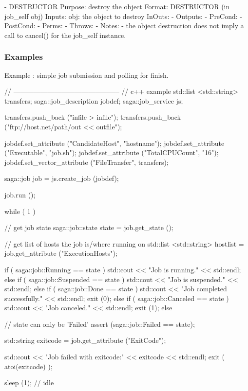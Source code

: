  \begin{myspec}
    - DESTRUCTOR
      Purpose:  destroy the object
      Format:   DESTRUCTOR        (in  job_self  obj)
      Inputs:   obj:               the object to destroy
      InOuts:   -
      Outputs:  -
      PreCond:  -
      PostCond: -
      Perms:    -
      Throws:   -
      Notes:    - the object destruction does not imply a 
                  call to cancel() for the job_self instance.
 \end{myspec}
 
 
 \subsubsection{Examples}
 
 \begin{mycode}
  Example : simple job submission and polling for finish.
 
  // -----------------------------------------------
  // c++ example
  std::list <std::string>    transfers;
  saga::job_description jobdef;
  saga::job_service     js;
 
  transfers.push_back ("infile > infile");
  transfers.push_back ("ftp://host.net/path/out << outfile");
 
  jobdef.set_attribute        ("CandidateHost", "hostname");
  jobdef.set_attribute        ("Executable",    "job.sh");
  jobdef.set_attribute        ("TotalCPUCount", "16");
  jobdef.set_vector_attribute ("FileTransfer",  transfers);
 
  saga::job job = js.create_job (jobdef);
 
  job.run ();
 
  while ( 1 )
  {
    // get job state
    saga::job::state state = job.get_state ();
 
    // get list of hosts the job is/where running on
    std::list <std::string> hostlist = job.get_attribute
                                       ("ExecutionHosts");
 
    if ( saga::job::Running == state )
    {
      std::cout << "Job is running." << std::endl;
    }
    else if ( saga::job::Suspended == state )
    {
      std::cout << "Job is suspended." << std::endl;
    }
    else if ( saga::job::Done == state )
    {
      std::cout << "Job completed successfully." << std::endl;
      exit (0);
    }
    else if ( saga::job::Canceled == state )
    {
      std::cout << "Job canceled." << std::endl;
      exit (1); 
    }
    else
    {
      // state can only be 'Failed'
      assert (saga::job::Failed == state); 
 
      std::string exitcode = job.get_attribute ("ExitCode");
 
      std::cout << "Job failed with exitcode:" 
                << exitcode 
                << std::endl;
      exit ( atoi(exitcode) );
    }
 
    sleep (1); // idle
  }
 \end{mycode}
 
